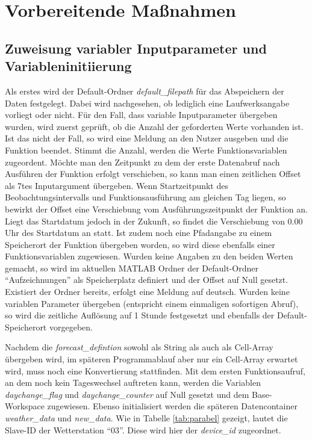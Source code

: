 \section{Vorbereitende Maßnahmen}
\subsection{Zuweisung variabler Inputparameter und Variableninitiierung}
Als erstes wird der Default-Ordner \textit{default\_filepath} für das Abspeichern der Daten festgelegt. Dabei wird nachgesehen, ob lediglich eine Laufwerksangabe vorliegt oder nicht. Für den Fall, dass variable Inputparameter übergeben wurden, wird zuerst geprüft, ob die Anzahl der geforderten Werte vorhanden ist. Ist das nicht der Fall, so wird eine Meldung an den Nutzer ausgeben und die Funktion beendet. Stimmt die Anzahl, werden die Werte Funktionsvariablen zugeordent. Möchte man den Zeitpunkt zu dem der erste Datenabruf nach Ausführen der Funktion erfolgt verschieben, so kann man einen zeitlichen Offset als 7tes Inputargument übergeben. Wenn Startzeitpunkt des Beobachtungsintervalls und Funktionsausführung am gleichen Tag liegen, so bewirkt der Offset eine Verschiebung vom Ausführungszeitpunkt der Funktion an. Liegt das Startdatum jedoch in der Zukunft, so findet die Verschiebung von 0.00 Uhr des Startdatum an statt. Ist zudem noch eine Pfadangabe zu einem Speicherort der Funktion übergeben worden, so wird diese ebenfalls einer Funktionsvariablen zugewiesen. Wurden keine Angaben zu den beiden Werten gemacht, so wird im aktuellen MATLAB Ordner der Default-Ordner \enquote{Aufzeichnungen} als Speicherplatz definiert und der Offset auf Null gesetzt. Existiert der Ordner bereits, erfolgt eine Meldung auf deutsch. Wurden keine variablen Parameter übergeben (entspricht einem einmaligen sofortigen Abruf), so wird die zeitliche Auflösung auf 1 Stunde festgesetzt und ebenfalls der Default-Speicherort vorgegeben. 

Nachdem die \textit{forecast\_defintion} sowohl als String als auch als Cell-Array übergeben wird, im späteren Programmablauf aber nur ein Cell-Array erwartet wird, muss noch eine Konvertierung stattfinden.\label{sendloop} Mit dem ersten Funktionsaufruf, an dem noch kein Tageswechsel auftreten kann, werden die Variablen \textit{daychange\_flag} und \textit{daychange\_counter} auf Null gesetzt und dem Base-Workspace zugewiesen. Ebenso initialisiert werden die späteren Datencontainer \textit{weather\_data} und \textit{new\_data}. Wie in Tabelle \ref{tab:parabel} gezeigt, lautet die Slave-ID der Wetterstation \enquote{03}. Diese wird hier der \textit{device\_id} zugeordnet. 
   
